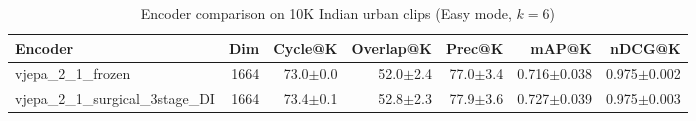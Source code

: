 \begin{table}[ht]
\centering
\caption{Encoder comparison on 10K Indian urban clips (Easy mode, $k=6$)}
\label{tab:encoder_comparison}
\begin{tabular}{lrrrrrr}
\toprule
Encoder & Dim & Cycle@K & Overlap@K & Prec@K & mAP@K & nDCG@K \\
\midrule
vjepa\_2\_1\_frozen & 1664 & 73.0{\tiny$\pm$0.0} & 52.0{\tiny$\pm$2.4} & 77.0{\tiny$\pm$3.4} & 0.716{\tiny$\pm$0.038} & 0.975{\tiny$\pm$0.002} \\
vjepa\_2\_1\_surgical\_3stage\_DI & 1664 & 73.4{\tiny$\pm$0.1} & 52.8{\tiny$\pm$2.3} & 77.9{\tiny$\pm$3.6} & 0.727{\tiny$\pm$0.039} & 0.975{\tiny$\pm$0.003} \\
\bottomrule
\end{tabular}
\end{table}